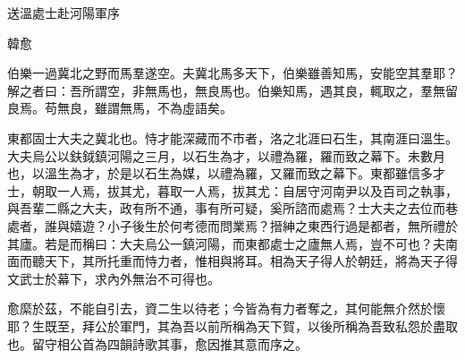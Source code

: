 送溫處士赴河陽軍序

韓愈

伯樂一過冀北之野而馬羣遂空。夫冀北馬多天下，伯樂雖善知馬，安能空其羣耶？解之者曰：吾所謂空，非無馬也，無良馬也。伯樂知馬，遇其良，輒取之，羣無留良焉。苟無良，雖謂無馬，不為虛語矣。

東都固士大夫之冀北也。恃才能深藏而不市者，洛之北涯曰石生，其南涯曰溫生。大夫烏公以鈇鉞鎮河陽之三月，以石生為才，以禮為羅，羅而致之幕下。未數月也，以溫生為才，於是以石生為媒，以禮為羅，又羅而致之幕下。東都雖信多才士，朝取一人焉，拔其尤，暮取一人焉，拔其尤：自居守河南尹以及百司之執事，與吾輩二縣之大夫，政有所不通，事有所可疑，奚所諮而處焉？士大夫之去位而巷處者，誰與嬉遊？小子後生於何考德而問業焉？搢紳之東西行過是都者，無所禮於其廬。若是而稱曰：大夫烏公一鎮河陽，而東都處士之廬無人焉，豈不可也？夫南面而聽天下，其所托重而恃力者，惟相與將耳。相為天子得人於朝廷，將為天子得文武士於幕下，求內外無治不可得也。

愈縻於茲，不能自引去，資二生以待老；今皆為有力者奪之，其何能無介然於懷耶？生既至，拜公於軍門，其為吾以前所稱為天下賀，以後所稱為吾致私怨於盡取也。留守相公首為四韻詩歌其事，愈因推其意而序之。